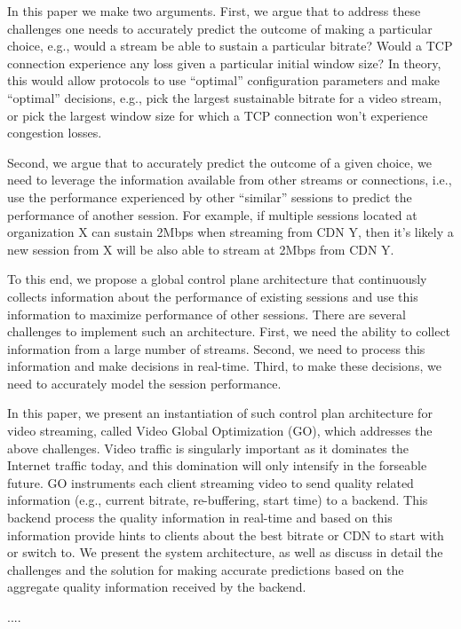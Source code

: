 
In this paper we make two arguments. First, we argue that to address these challenges one needs to accurately predict the outcome of making a particular choice, e.g., would a stream be able to sustain a particular bitrate? Would a TCP connection experience any loss given a particular initial window size? In theory, this would allow protocols to use ``optimal'' configuration parameters and make ``optimal'' decisions, e.g., pick the largest sustainable bitrate for a video stream,  or pick the largest window size for which a TCP connection won't experience congestion losses. 

Second, we argue that to accurately predict the outcome of a given choice, we need to leverage the information available from other streams or connections, i.e., use the performance experienced by other ``similar'' sessions to predict the performance of another session. For example, if multiple sessions located at organization X can sustain 2Mbps when streaming from CDN Y, then it's likely a new session from X will be also able to stream at 2Mbps from CDN Y. 

To this end, we propose a global control plane architecture that continuously collects information about the performance of existing sessions and use this information to maximize performance of other sessions. There are several challenges to implement such an architecture. First, we need the ability to collect information from a large number of streams. Second, we need to process this information and make decisions in real-time. Third, to make these decisions, we need to accurately model the session performance. 

In this paper, we present an instantiation of such control plan architecture for video streaming, called Video Global Optimization (GO), which addresses the above challenges.  Video traffic is singularly important as it dominates the Internet traffic today, and this domination will only intensify in the forseable future. GO instruments each client streaming video to send quality related information (e.g., current bitrate, re-buffering, start time) to a backend. This backend process the quality information in real-time and based on this information provide hints to clients about the best bitrate or CDN to start with or switch to. We present the system architecture, as well as discuss in detail the challenges and the solution for making accurate predictions based on the aggregate quality information received by the backend. 

....



